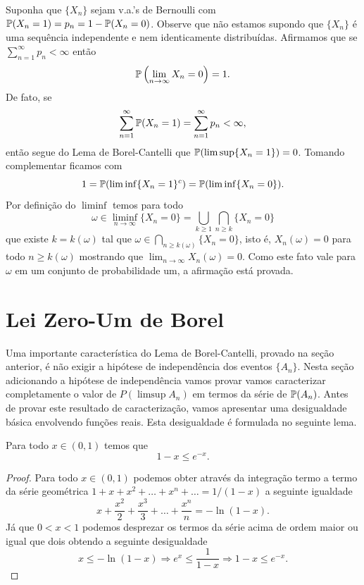 \begin{exemplo}
	Suponha que $\{X_n\}$ sejam v.a.'s de Bernoulli 
	com $\P(X_n=1)=p_n=1-\P(X_n=0)$. 
	Observe que não estamos supondo que $\{X_n\}$ é
	uma sequência independente e nem identicamente distribuídas.
	Afirmamos que se $\sum_{n=1}^{\infty}p_n<\infty$ então 
		\[
			\P\left( \lim_{n\to\infty} X_n=0\right)=1. 
		\]
	De fato, se 
		\[
			 \sum_{n=1}^{\infty} \P(X_n=1) 
			 = 
			 \sum_{n=1}^{\infty}p_n 
			 < \infty,
		\]
	então segue do Lema de Borel-Cantelli que $\P(\limsup \{X_n=1\})=0$.
	Tomando complementar ficamos com 
	\[
		1
		=
		\P(\liminf \{X_n=1\}^c)
		=
		\P(\liminf \{X_n=0\}).
	\]
	Por definição do $\liminf$ temos 
	para todo 
	\[
		\omega
		\in 
		\liminf_{n\to\infty} \{X_n=0\}
		=
		\bigcup_{k\geq 1} \bigcap_{n\geq k} \{X_n=0\}		
	\]
	que existe $k=k(\omega)$ tal que 
	$\omega \in \bigcap_{n\geq k(\omega)} \{X_n=0\}$,
	isto é, $X_n(\omega)=0$ para todo $n\geq k(\omega)$
	mostrando que $\lim_{n\to\infty} X_n(\omega)=0$.
	Como este fato vale para $\omega$ em um conjunto 
	de probabilidade um, a afirmação está provada.
\end{exemplo}













\section{Lei Zero-Um de Borel}

Uma importante característica do Lema de Borel-Cantelli, 
provado na seção anterior, é não exigir a hipótese 
de independência dos eventos $\{A_n\}$. Nesta seção 
adicionando a hipótese de independência vamos provar
vamos caracterizar completamente o valor de 
$P(\limsup A_n)$ em termos da série de $\P(A_n)$.
Antes de provar este resultado de caracterização, 
vamos apresentar uma desigualdade básica 
envolvendo funções reais. Esta desigualdade é formulada
no seguinte lema.


\begin{lema}\label{lema-1-x<=exp(-x)}
Para todo $x\in (0,1)$ temos que 
	\[
		1-x\leq e^{-x}.
	\]
\end{lema}

\begin{proof}
Para todo $x\in(0,1)$ podemos
obter através da integração termo a termo da série geométrica
	\(
		1+x+x^2+\ldots+x^n+\ldots = 1/(1-x)
	\)
a seguinte igualdade
	\[
		x+\frac{x^2}{2}+\frac{x^3}{3}+\ldots+\frac{x^n}{n} = -\ln(1-x).
	\]
Já que $0<x<1$ podemos desprezar os termos da série acima de
ordem maior ou igual que dois obtendo a seguinte desigualdade 
	\[
	 x \leq -\ln(1-x)
	 \Longrightarrow
	 e^x\leq \frac{1}{1-x}
	 \Longrightarrow
	 1-x\leq e^{-x}.
	\]	
\end{proof}



